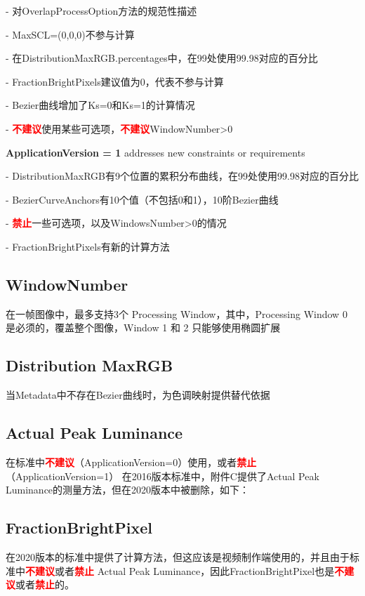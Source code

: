 \documentclass{article}
\begin{document}
- 对OverlapProcessOption方法的规范性描述

- MaxSCL=(0,0,0)不参与计算

- 在DistributionMaxRGB.percentages中，在99处使用99.98对应的百分比

- FractionBrightPixels建议值为0，代表不参与计算

- Bezier曲线增加了Ks=0和Ks=1的计算情况

- \textbf{\textcolor{red}{不建议}}使用某些可选项，\textbf{\textcolor{red}{不建议}}WindowNumber>0

\noindent \textbf{ApplicationVersion = 1} addresses new constraints or requirements

- DistributionMaxRGB有9个位置的累积分布曲线，在99处使用99.98对应的百分比

- BezierCurveAnchors有10个值（不包括0和1），10阶Bezier曲线

- \textbf{\textcolor{red}{禁止}}一些可选项，以及WindowsNumber>0的情况

- FractionBrightPixels有新的计算方法

\subsection{WindowNumber}
在一帧图像中，最多支持3个 Processing Window，其中，Processing Window 0 是必须的，覆盖整个图像，Window 1 和 2 只能够使用椭圆扩展

\subsection{Distribution MaxRGB}
当Metadata中不存在Bezier曲线时，为色调映射提供替代依据

\subsection{Actual Peak Luminance}
在标准中\textbf{\textcolor{red}{不建议}}（ApplicationVersion=0）使用，或者\textbf{\textcolor{red}{禁止}}（ApplicationVersion=1）
在2016版本标准中，附件C提供了Actual Peak Luminance的测量方法，但在2020版本中被删除，如下：


\subsection{FractionBrightPixel}
在2020版本的标准中提供了计算方法，但这应该是视频制作端使用的，并且由于标准中\textbf{\textcolor{red}{不建议}}或者\textbf{\textcolor{red}{禁止}} Actual Peak Luminance，因此FractionBrightPixel也是\textbf{\textcolor{red}{不建议}}或者\textbf{\textcolor{red}{禁止}}的。
\end{document}
